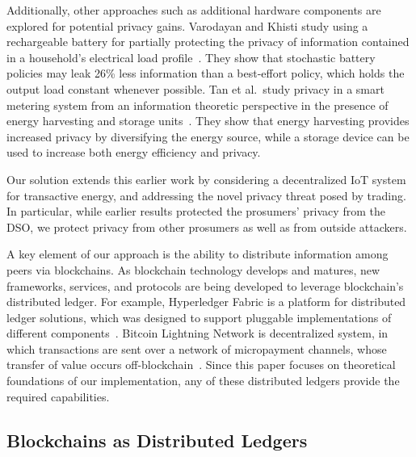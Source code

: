 Additionally, other approaches such as additional hardware components
are explored for potential privacy gains. Varodayan and Khisti study
using a rechargeable battery for partially protecting the privacy of
information contained in a household's electrical load
profile~\cite{varodayan2011smart}. They show that stochastic battery
policies may leak 26\% less information than a best-effort policy,
which holds the output load constant whenever possible. Tan et
al.\ study privacy in a smart metering system from an information
theoretic perspective in the presence of energy harvesting and storage
units~\cite{tan2013increasing}. They show that energy harvesting
provides increased privacy by diversifying the energy source, while a
storage device can be used to increase both energy efficiency and
privacy.

Our solution extends this earlier work by considering a decentralized
IoT system for transactive energy, and addressing the novel privacy
threat posed by trading. In particular, while earlier results
protected the prosumers' privacy from the DSO, we protect privacy from
other prosumers as well as from outside attackers.  

A key element of our approach is the ability to distribute information
among peers via blockchains.  As blockchain technology develops and
matures, new frameworks, services, and protocols are being developed
to leverage blockchain's distributed ledger. For example, Hyperledger
Fabric is a platform for distributed ledger solutions, which was
designed to support pluggable implementations of different
components~\cite{hyperledger2017fabric}. Bitcoin Lightning Network is
decentralized system, in which transactions are sent over a network of
micropayment channels, whose transfer of value occurs
off-blockchain~\cite{poon2016bitcoin}. Since this paper focuses on
theoretical foundations of our implementation, any of these
distributed ledgers provide the required capabilities.


\iffalse
\subsection{Blockchains as Distributed Ledgers}

